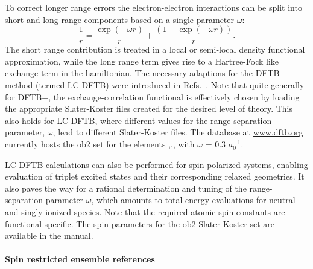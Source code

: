 \documentclass{revtex4-1}
\newcommand{\dftbp}{DFTB+}
\begin{document}
To correct longer range errors the electron-electron interactions can be split
into short and long range components based on a single parameter $\omega$:
\begin{equation}
  \label{range-sep}
  \frac{1}{r} = \frac{\exp(-\omega r)}{r} + \frac{\left(1- \exp(-\omega
    r)\right)}{r}.
\end{equation}
The short range contribution is treated in a local or semi-local density
functional approximation, while the long range term gives rise to a Hartree-Fock
like exchange term in the hamiltonian.\cite{Baer2010} The necessary adaptions
for the DFTB method (termed LC-DFTB) were introduced in
Refs.~. Note that quite generally for \dftbp{},
the exchange-correlation functional is effectively chosen by loading the
appropriate Slater-Koster files created for the desired level of theory. This
also holds for LC-DFTB, where different values for the range-separation
parameter, $\omega$, lead to different Slater-Koster files. The database at
\url{www.dftb.org} currently hosts the ob2 set\cite{Vuong2019} for the elements
,,, with $\omega$ = 0.3 $a_0^{-1}$.

LC-DFTB calculations can also be performed for spin-polarized systems, enabling
evaluation of triplet excited states and their corresponding relaxed geometries.
It also paves the way for a rational determination and tuning\cite{Baer2010} of
the range-separation parameter $\omega$, which amounts to total energy
evaluations for neutral and singly ionized species. Note that the required
atomic spin constants are functional specific. The spin parameters for the ob2
Slater-Koster set are available in the manual.


\paragraph{Spin restricted ensemble references}
\end{document}
